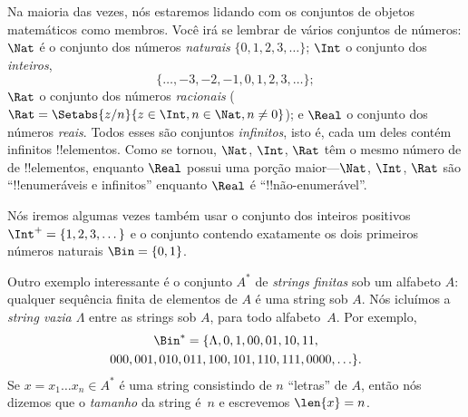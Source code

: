 \documentclass[../../../include/open-logic-section]{subfiles}
\begin{document}


\begin{ex}
Na maioria das vezes, nós estaremos lidando com os conjuntos de
objetos matemáticos como membros. Você irá se lembrar de vários
conjuntos de números: $\Nat$ é o conjunto dos números \emph{naturais}
$\{0, 1, \allowbreak 2, 3, \dots\}$; $\Int$ o conjunto dos \emph{inteiros},
\[
\{\dots, -3, -2,
-1, 0, 1, 2, 3, \dots\};
\]
$\Rat$ o conjunto dos números \emph{racionais} 
($\Rat = \Setabs{z/n}{z \in \Int, n \in \Nat, n \neq 0}$); e
$\Real$ o conjunto dos números \emph{reais}. Todos esses são conjuntos
\emph{infinitos}, isto é, cada um deles contém infinitos !!{elemento}s.
Como se tornou, $\Nat$, $\Int$, $\Rat$ têm o mesmo número de 
de !!{elemento}s, enquanto $\Real$ possui uma porção maior---$\Nat$,
$\Int$, $\Rat$ são ``!!{enumeráveis} e infinitos'' enquanto
$\Real$ é ``!!{não-enumerável}''.

Nós iremos algumas vezes também usar o conjunto dos inteiros positivos
$\Int^+ = \{1, 2, 3, \dots\}$ e o conjunto contendo exatamente os dois 
primeiros números naturais $\Bin = \{0, 1\}$.
\end{ex}



\begin{ex}[Strings]
Outro exemplo interessante é o conjunto $A^{*}$ de \emph{strings finitas}
sob um alfabeto $A$: qualquer sequência finita de elementos de $A$
é uma string sob $A$. Nós icluímos a \emph{string vazia $\Lambda$}
entre as strings sob $A$, para todo alfabeto~$A$. Por exemplo,
\begin{multline*}
\Bin^*
=\{\Lambda,0,1,00,01,10,11,\\
000,001,010,011,100,101,110,111,0000,\ldots\}.
\end{multline*}
Se $x=x_{1}\ldots x_{n}\in A^{*}$ é uma string consistindo de $n$
``letras'' de $A$, então nós dizemos que o \emph{tamanho} da string é~$n$
e escrevemos $\len{x}=n$.
\end{ex}
\end{document}

